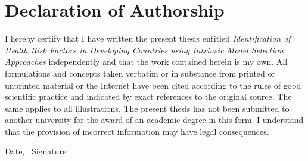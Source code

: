 \section*{Declaration of Authorship}

\vspace{1cm}

I hereby certify that I have written the present thesis entitled \textit{Identification of Health Risk Factors in Developing Countries using Intrinsic Model Selection Approaches} independently and that the work contained herein is my own. All formulations and concepts taken verbatim or in substance from printed or unprinted material or the Internet have been cited according to the rules of good scientific practice and indicated by exact references to the original source. The same applies to all illustrations. The present thesis has not been submitted to another university for the award of an academic degree in this form. I understand that the provision of incorrect information may have legal consequences.

\vspace{2.5cm}
\begin{flushright}
    \hspace{10cm} Date, \ Signature 
\end{flushright}
